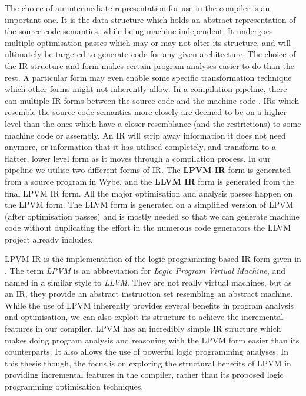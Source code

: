 The choice of an intermediate representation for use in the compiler is an
important one. It is the data structure which holds an abstract representation
of the source code semantics, while being machine independent. It undergoes
multiple optimisation passes which may or may not alter its structure, and will
ultimately be targeted to generate code for any given architecture. The choice
of the IR structure and form makes certain program analyses easier to do than
the rest. A particular form may even enable some specific transformation
technique which other forms might not inherently allow. In a compilation
pipeline, there can multiple IR forms between the source code and the machine
code \citep{irnote}. IRs which resemble the source code semantics more closely
are deemed to be on a higher level than the ones which have a closer
resemblance (and the restrictions) to some machine code or assembly. An IR will
strip away information it does not need anymore, or information that it has
utilised completely, and transform to a flatter, lower level form as it moves
through a compilation process. In our pipeline we utilise two different forms
of IR. The \textbf{LPVM IR} form is generated from a source program in Wybe,
and the \textbf{LLVM IR} form is generated from the final LPVM IR form. All the
major optimisation and analysis passes happen on the LPVM form. The LLVM form
is generated on a simplified version of LPVM (after optimisation passes) and is
mostly needed so that we can generate machine code without duplicating the
effort in the numerous code generators the LLVM project already includes.

LPVM IR is the implementation of the logic programming based IR form given in
\cite{lpvm2015}. The term \textit{LPVM} is an abbreviation for \textit{Logic
  Program Virtual Machine}, and named in a similar style to \textit{LLVM}. They
are not really virtual machines, but as an IR, they provide an abstract
instruction set resembling an abstract machine. While the use of LPVM
inherently provides several benefits in program analysis and optimisation, we
can also exploit its structure to achieve the incremental features in our
compiler. LPVM has an incredibly simple IR structure which makes doing program
analysis and reasoning with the LPVM form easier than its counterparts. It also
allows the use of powerful logic programming analyses. In this thesis though,
the focus is on exploring the structural benefits of LPVM in providing
incremental features in the compiler, rather than its proposed logic
programming optimisation techniques.

